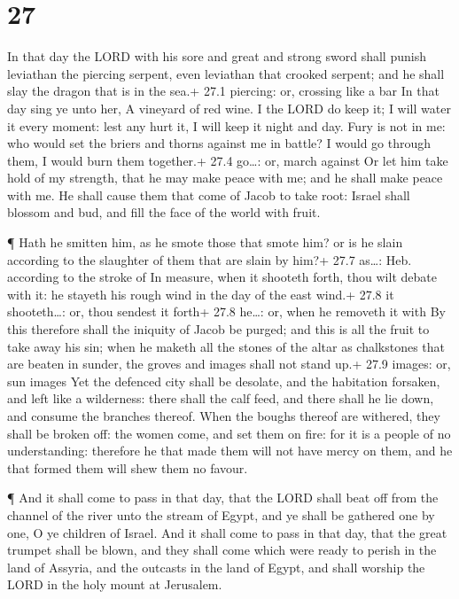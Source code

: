 \hypertarget{section-26}{%
\section{27}\label{section-26}}

 In that day the LORD with his sore and great and strong
sword shall punish leviathan the piercing serpent, even leviathan that
crooked serpent; and he shall slay the dragon that is in the sea.+ 27.1
piercing: or, crossing like a bar  In that day sing ye unto
her, A vineyard of red wine.  I the LORD do keep it; I will
water it every moment: lest any hurt it, I will keep it night and day.
 Fury is not in me: who would set the briers and thorns
against me in battle? I would go through them, I would burn them
together.+ 27.4 go\ldots: or, march against  Or let him take
hold of my strength, that he may make peace with me; and he shall make
peace with me.  He shall cause them that come of Jacob to
take root: Israel shall blossom and bud, and fill the face of the world
with fruit.

 ¶ Hath he smitten him, as he smote those that smote him? or
is he slain according to the slaughter of them that are slain by him?+
27.7 as\ldots: Heb. according to the stroke of  In measure,
when it shooteth forth, thou wilt debate with it: he stayeth his rough
wind in the day of the east wind.+ 27.8 it shooteth\ldots: or, thou
sendest it forth+ 27.8 he\ldots: or, when he removeth it with
 By this therefore shall the iniquity of Jacob be purged;
and this is all the fruit to take away his sin; when he maketh all the
stones of the altar as chalkstones that are beaten in sunder, the groves
and images shall not stand up.+ 27.9 images: or, sun images
 Yet the defenced city shall be desolate, and the
habitation forsaken, and left like a wilderness: there shall the calf
feed, and there shall he lie down, and consume the branches thereof.
 When the boughs thereof are withered, they shall be broken
off: the women come, and set them on fire: for it is a people of no
understanding: therefore he that made them will not have mercy on them,
and he that formed them will shew them no favour.

 ¶ And it shall come to pass in that day, that the LORD
shall beat off from the channel of the river unto the stream of Egypt,
and ye shall be gathered one by one, O ye children of Israel.
 And it shall come to pass in that day, that the great
trumpet shall be blown, and they shall come which were ready to perish
in the land of Assyria, and the outcasts in the land of Egypt, and shall
worship the LORD in the holy mount at Jerusalem.

